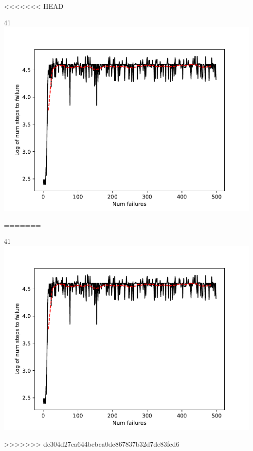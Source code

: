 <<<<<<< HEAD
\begin{answer}
41
\includegraphics[width=\textwidth]{control.pdf}
\end{answer}
=======
\begin{answer}
41
\includegraphics[width=\textwidth]{control.pdf}
\end{answer}
>>>>>>> dc304d27ca644bcbca0dc867837b32d7de83fed6
